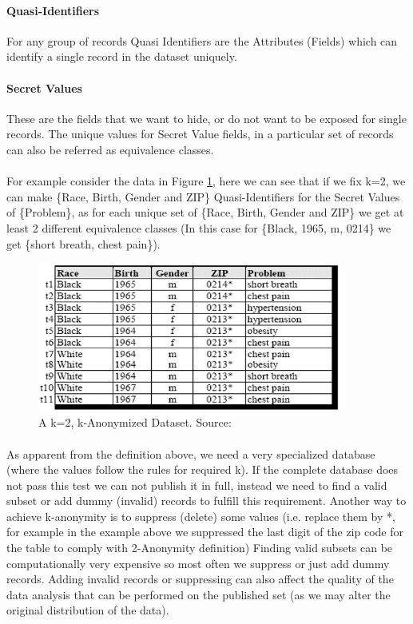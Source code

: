 \documentclass[12pt]{report}
\theoremstyle{named}
\begin{document}
\paragraph{Quasi-Identifiers}
For any group of records Quasi Identifiers are the Attributes (Fields) which can identify a single record in the dataset uniquely.
\paragraph{Secret Values}
These are the fields that we want to hide, or do not want to be exposed for single records. The unique values for Secret Value fields, in a particular set of records can also be referred as equivalence classes.

\paragraph{}
For example consider the data in Figure \ref{fig:kAon=2}, here we can see that if we fix k=2, we can make \{Race, Birth, Gender and ZIP\} Quasi-Identifiers for the Secret Values of \{Problem\}, as for each unique set of \{Race, Birth, Gender and ZIP\} we get at least 2 different equivalence classes (In this case for \{Black, 1965, m, 0214\} we get \{short breath, chest pain\}).
\begin{figure}[ht]
\centering
        \includegraphics[width=100mm,scale=0.5]{Images/k2Diversified.png}
    \caption{A k=2, k-Anonymized Dataset. Source:\cite{sweeney2002k}}
    \label{fig:kAon=2}
\end{figure}

\paragraph{}
As apparent from the definition above, we need a very specialized database (where the values follow the rules for required k). If the complete database does not pass this test we can not publish it in full, instead we need to find a valid subset or add dummy (invalid) records to fulfill this requirement. Another way to achieve k-anonymity is to suppress (delete) some values (i.e. replace them by *, for example in the example above we suppressed the last digit of the zip code for the table to comply with 2-Anonymity definition) Finding valid subsets can be computationally very expensive so most often we suppress or just add dummy records. Adding invalid records or suppressing can also affect the quality of the data analysis that can be performed on the published set (as we may alter the original distribution of the data).
\end{document}

